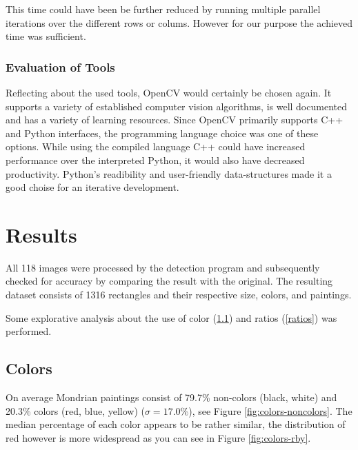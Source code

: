 \documentclass[serif,article,noparskip]{agse-thesis}
\begin{document}
This time could have been be further reduced by running multiple parallel
iterations over the different rows or colums. However for our purpose the
achieved time was sufficient.

\subsubsection{Evaluation of Tools}

Reflecting about the used tools, OpenCV would certainly be chosen again. It
supports a variety of established computer vision algorithms, is well documented
and has a variety of learning resources. Since OpenCV primarily supports C++ and
Python interfaces, the programming language choice was one of these options.
While using the compiled language C++ could have increased performance over the
interpreted Python, it would also have decreased productivity. Python's
readibility and user-friendly data-structures made it a good choise for an
iterative development.

\section{Results} \label{results}

 All 118 images were processed by the detection program and subsequently checked
 for accuracy by comparing the result with the original. The resulting dataset
 consists of 1316 rectangles and their respective size, colors, and paintings.

Some explorative analysis about the use of color (\ref{color}) and ratios
(\ref{ratios}) was performed.

\subsection{Colors} \label{color}

On average Mondrian paintings consist of 79.7\% non-colors (black, white) and
20.3\% colors (red, blue, yellow) ($\sigma = 17.0\%$), see Figure
\ref{fig:colors-noncolors}. The median percentage of each color appears to be
rather similar, the distribution of red however is more widespread as you can
see in Figure \ref{fig:colors-rby}.
\end{document}
